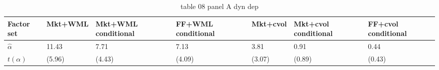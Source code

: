 \begin{table}[htbp]
  \centering
  \caption{table 08 panel A dyn dep}
  \label{tab:table_08_panel_A_dyn_dep}
  \begin{tabular}{lllllll}
\toprule
Factor set & Mkt+WML & Mkt+WML conditional & FF+WML conditional & Mkt+cvol & Mkt+cvol conditional & FF+cvol conditional \\
\midrule
$\hat{\alpha}$ & 11.43 & 7.71 & 7.13 & 3.81 & 0.91 & 0.44 \\
$t(\alpha)$ & (5.96) & (4.43) & (4.09) & (3.07) & (0.89) & (0.43) \\
\bottomrule
\end{tabular}

\end{table}
